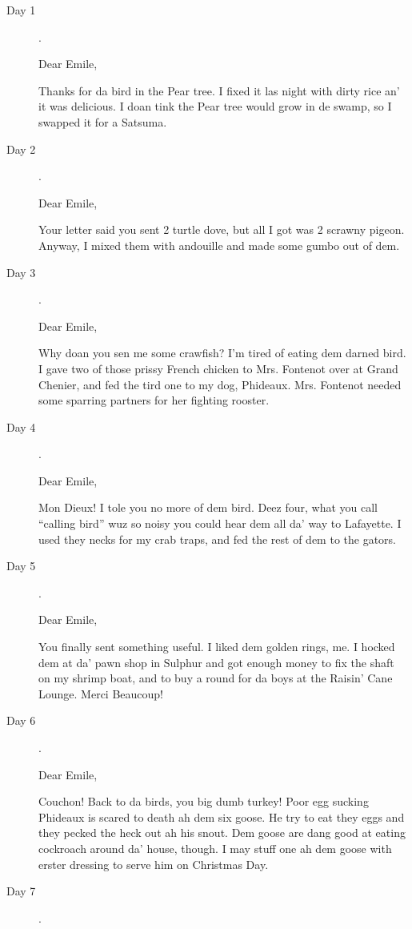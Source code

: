 \documentclass[fleqn,addpoints]{exam}
\begin{document}
\begin{description}
\item[Day 1].

Dear Emile,

Thanks for da bird in the Pear tree. I fixed it las night with dirty rice an' it was delicious. I doan tink the Pear
tree would grow in de swamp, so I swapped it for a Satsuma.

\item[Day 2].

Dear Emile,

Your letter said you sent 2 turtle dove, but all I got was 2 scrawny pigeon. Anyway, I mixed them with andouille and
made some gumbo out of dem.

\item[Day 3].

Dear Emile,

Why doan you sen me some crawfish? I'm tired of eating dem darned bird. I gave two of those prissy French chicken to
Mrs. Fontenot over at Grand Chenier, and fed the tird one to my dog, Phideaux. Mrs. Fontenot needed some sparring
partners for her fighting rooster.

\item[Day 4].

Dear Emile,

Mon Dieux! I tole you no more of dem bird. Deez four, what you call ``calling bird'' wuz so noisy you could hear dem all
da' way to Lafayette. I used they necks for my crab traps, and fed the rest of dem to the gators.

\item[Day 5].

Dear Emile,

You finally sent something useful. I liked dem golden rings, me. I hocked dem at da' pawn shop in Sulphur and got enough
money to fix the shaft on my shrimp boat, and to buy a round for da boys at the Raisin' Cane Lounge. Merci Beaucoup!

\item[Day 6].

Dear Emile,

Couchon! Back to da birds, you big dumb turkey! Poor egg sucking Phideaux is scared to death ah dem six goose. He try to
eat they eggs and they pecked the heck out ah his snout. Dem goose are dang good at eating cockroach around da' house,
though. I may stuff one ah dem goose with erster dressing to serve him on Christmas Day.

\item[Day 7].


\end{description}
\end{document}
